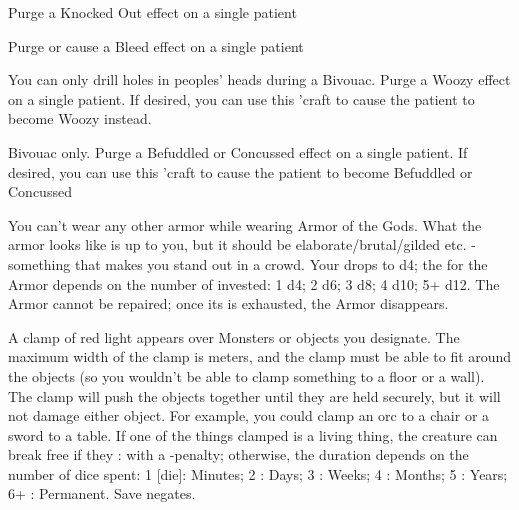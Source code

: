 {  \LEECHCRAFT[
    Name=Smelling Salts,
    Link=leechcraft-smelling-salts,
    Target=3,
    Keywords=Purge,
    Reversible=N
  ]
  Purge a Knocked Out effect on a single patient


  \LEECHCRAFT[
    Name=Staunch,
    Link=leechcraft-staunch,
    Target=4,
    Keywords=Purge,
    Reversible=Y
  ]
  Purge or cause a Bleed effect on a single patient


  \LEECHCRAFT[
    Name=Trepanation,
    Link=leechcraft-trepanation,
    Target=8,
    Keywords=Purge,
    Reversible=Y  
  ]
  You can only drill holes in peoples' heads during a Bivouac.  Purge a Woozy effect on a single patient.   If desired, you can use this 'craft to cause the patient to become Woozy instead.

  \LEECHCRAFT[
    Name=Virtigo,
    Link=leechcraft-virtigo,
    Target=6,
    Keywords=None,
    Reversible=Y 
  ]
  
  Bivouac only.  Purge a Befuddled or Concussed effect on a single patient.   If desired, you can use this 'craft to cause the patient to become Befuddled or Concussed


\newpage




\MYSTERY [
  Name = Armor of the Gods,
  Link = arcana-mystery-armor-of-the-gods,
  Paradigm = Force,
  Save = N,
  Duration = Session,
  Target = Self
]

You can't wear any other armor while wearing Armor of the Gods.  What the armor looks like is up to you, but it should be elaborate/brutal/gilded etc. - something that makes you stand out in a crowd.  Your \MD drops to d4; the \UD for the Armor depends on the number of \DICE invested: 1 d4; 2 d6; 3 d8; 4 d10; 5+ d12.  The Armor cannot be repaired; once its \UD is exhausted, the Armor disappears.


\MYSTERY [
  Name = Clamp,
  Link = arcana-mystery-clamp,
  Paradigm = Force,
  Save = Y (neg.),
  Duration = varies,
  Target = Nearby Target(s)
]

A clamp of red light appears over \DICE Monsters or objects you designate. The maximum width of the clamp is \DICE meters, and the clamp must be able to fit around the objects (so you wouldn't be able to clamp something to a floor or a wall).  The clamp will push the objects together until they are held securely, but it will not damage either object.  For example, you could clamp an orc to a chair or a sword to a table.  If one of the things clamped is a living thing, the creature can break free if they \RB : \VIG with a -\DICE penalty; otherwise, the duration depends on the number of dice spent:  1 [die]: Minutes; 2 \DICE: Days; 3 \DICE: Weeks; 4 \DICE: Months; 5 \DICE: Years; 6+ \DICE: Permanent.  Save negates.


}

